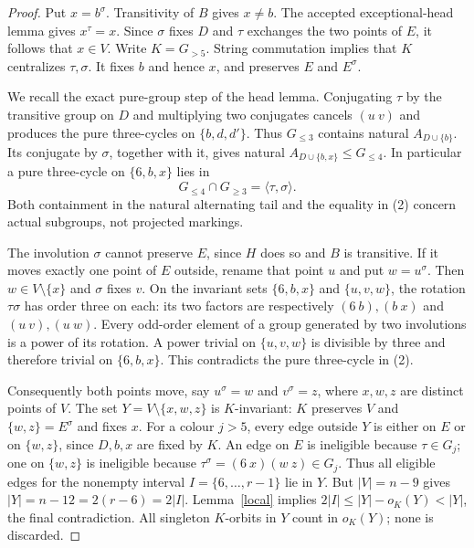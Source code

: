 \documentclass[11pt,a4paper]{article}
\newcommand{\gen}[1]{\langle#1\rangle}
\begin{document}
\begin{proof}
Put $x=b^\sigma$. Transitivity of $B$ gives $x\ne b$.
The accepted exceptional-head lemma gives $x^\tau=x$.
Since $\sigma$ fixes $D$ and $\tau$ exchanges the two points
of $E$, it follows that $x\in V$. Write $K=G_{>5}$.
String commutation implies that $K$ centralizes $\tau,\sigma$.
It fixes $b$ and hence $x$, and preserves $E$ and $E^\sigma$.

We recall the exact pure-group step of the head lemma.
Conjugating $\tau$ by the transitive group on $D$ and multiplying
two conjugates cancels $(u\ v)$ and produces the pure three-cycles
on $\{b,d,d'\}$. Thus $G_{\le3}$ contains natural
$A_{D\cup\{b\}}$. Its conjugate by $\sigma$, together with
it, gives natural $A_{D\cup\{b,x\}}\le G_{\le4}$.
In particular a pure three-cycle on $\{6,b,x\}$ lies in
\[
             G_{\le4}\cap G_{\ge3}=\gen{\tau,\sigma}.  \tag{2}
\]
Both containment in the natural alternating tail and the equality
in (2) concern actual subgroups, not projected markings.

The involution $\sigma$ cannot preserve $E$, since $H$ does so
and $B$ is transitive. If it moves exactly one point of $E$
outside, rename that point $u$ and put $w=u^\sigma$.
Then $w\in V\setminus\{x\}$ and $\sigma$ fixes $v$.
On the invariant sets $\{6,b,x\}$ and $\{u,v,w\}$,
the rotation $\tau\sigma$ has order three on each:
its two factors are respectively $(6\ b),(b\ x)$ and
$(u\ v),(u\ w)$. Every odd-order element of a group generated
by two involutions is a power of its rotation. A power trivial on
$\{u,v,w\}$ is divisible by three and therefore trivial on
$\{6,b,x\}$. This contradicts the pure three-cycle in (2).

Consequently both points move, say $u^\sigma=w$ and
$v^\sigma=z$, where $x,w,z$ are distinct points of $V$.
The set $Y=V\setminus\{x,w,z\}$ is $K$-invariant:
$K$ preserves $V$ and $\{w,z\}=E^\sigma$ and fixes $x$.
For a colour $j>5$, every edge outside $Y$ is either on $E$
or on $\{w,z\}$, since $D,b,x$ are fixed by $K$.
An edge on $E$ is ineligible because $\tau\in G_j$;
one on $\{w,z\}$ is ineligible because
$\tau^\sigma=(6\ x)(w\ z)\in G_j$.
Thus all eligible edges for the nonempty interval
$I=\{6,\ldots,r-1\}$ lie in $Y$.
But $|V|=n-9$ gives $|Y|=n-12=2(r-6)=2|I|$.
Lemma~\ref{local} implies $2|I|\le |Y|-o_K(Y)<|Y|$,
the final contradiction. All singleton $K$-orbits in $Y$ count
in $o_K(Y)$; none is discarded.
\end{proof}
\end{document}
